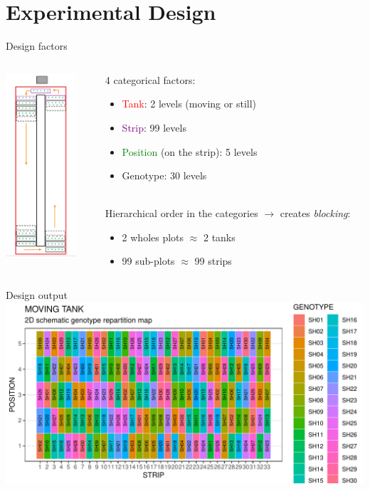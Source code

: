 \documentclass[]{beamer}
\begin{document}
\section{Experimental Design}
\begin{frame}{Design factors}
\begin{columns}
\begin{column}{0.3\textwidth}
\centering
\includegraphics[height=6.8cm]{Pictures/factors.PNG}
\end{column}
\begin{column}{0.7\textwidth}
4 categorical factors:
\begin{itemize}
    \item \textcolor{red}{Tank}: 2 levels (moving or still)
    \item \textcolor{purple}{Strip}: 99 levels
    \item \textcolor{green}{Position} (on the strip): 5 levels
    \item Genotype: 30 levels
\end{itemize}~\\
Hierarchical order in the categories $\rightarrow$ creates \textit{blocking}:
\begin{itemize}
    \item 2 wholes plots $\approx$ 2 tanks
    \item 99 sub-plots $\approx$ 99 strips
\end{itemize}
\end{column}
\end{columns}
\end{frame}

\begin{frame}{Design output}
\centering
\includegraphics[width=\textwidth]{Pictures/moving_layout_30_genotypes.pdf}
\end{frame}
\end{document}
